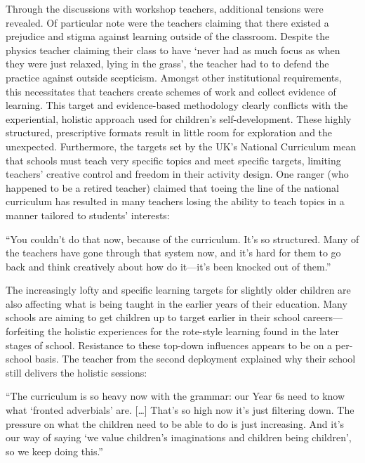 Through the discussions with workshop teachers, additional tensions were revealed. Of particular note were the teachers claiming that there existed a prejudice and stigma against learning outside of the classroom. Despite the physics teacher claiming their class to have `never had as much focus as when they were just relaxed, lying in the grass', the teacher had to to defend the practice against outside scepticism. Amongst other institutional requirements, this necessitates that teachers create schemes of work and collect evidence of learning. This target and evidence-based methodology clearly conflicts with the experiential, holistic approach used for children’s self-development. These highly structured, prescriptive formats result in little room for exploration and the unexpected. Furthermore, the targets set by the UK’s National Curriculum mean that schools must teach very specific topics and meet specific targets, limiting teachers’ creative control and freedom in their activity design. One ranger (who happened to be a retired teacher) claimed that toeing the line of the national curriculum has resulted in many teachers losing the ability to teach topics in a manner tailored to students’ interests:

\begin{displayquote}
“You couldn't do that now, because of the curriculum. It’s so structured. Many of the teachers have gone through that system now, and it’s hard for them to go back and think creatively about how do it---it’s been knocked out of them.”
\end{displayquote}

The increasingly lofty and specific learning targets for slightly older children are also affecting what is being taught in the earlier years of their education. Many schools are aiming to get children up to target earlier in their school careers---forfeiting the holistic experiences for the rote-style learning found in the later stages of school. Resistance to these top-down influences appears to be on a per-school basis. The teacher from the second deployment explained why their school still delivers the holistic sessions:

\begin{displayquote}
“The curriculum is so heavy now with the grammar: our Year 6s need to know what `fronted adverbials' are. […] That's so high now it’s just filtering down. The pressure on what the children need to be able to do is just increasing. And it's our way of saying `we value children’s imaginations and children being children', so we keep doing this.”
\end{displayquote}

